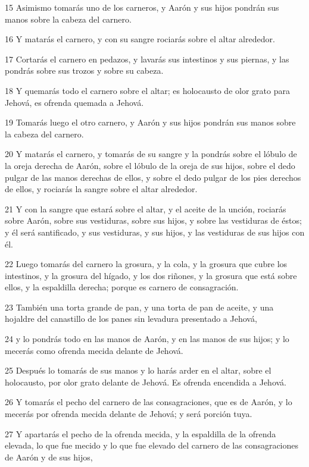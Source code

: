 \par 15 Asimismo tomarás uno de los carneros, y Aarón y sus hijos pondrán sus manos sobre la cabeza del carnero.
\par 16 Y matarás el carnero, y con su sangre rociarás sobre el altar alrededor.
\par 17 Cortarás el carnero en pedazos, y lavarás sus intestinos y sus piernas, y las pondrás sobre sus trozos y sobre su cabeza.
\par 18 Y quemarás todo el carnero sobre el altar; es holocausto de olor grato  para Jehová, es ofrenda quemada a Jehová.
\par 19 Tomarás luego el otro carnero, y Aarón y sus hijos pondrán sus manos sobre la cabeza del carnero.
\par 20 Y matarás el carnero, y tomarás de su sangre y la pondrás sobre el lóbulo de la oreja derecha de Aarón, sobre el lóbulo de la oreja de sus hijos, sobre el dedo pulgar de las manos derechas de ellos, y sobre el dedo pulgar de los pies derechos de ellos, y rociarás la sangre sobre el altar alrededor.
\par 21 Y con la sangre que estará sobre el altar, y el aceite de la unción, rociarás sobre Aarón, sobre sus vestiduras, sobre sus hijos, y sobre las vestiduras de éstos; y él será santificado, y sus vestiduras, y sus hijos, y las vestiduras de sus hijos con él.
\par 22 Luego tomarás del carnero la grosura, y la cola, y la grosura que cubre los intestinos, y la grosura del hígado, y los dos riñones, y la grosura que está sobre ellos, y la espaldilla derecha; porque es carnero de consagración.
\par 23 También una torta grande de pan, y una torta de pan de aceite, y una hojaldre del canastillo de los panes sin levadura presentado a Jehová,
\par 24 y lo pondrás todo en las manos de Aarón, y en las manos de sus hijos; y lo mecerás como ofrenda mecida delante de Jehová.
\par 25 Después lo tomarás de sus manos y lo harás arder en el altar, sobre el holocausto, por olor grato delante de Jehová. Es ofrenda encendida a Jehová.
\par 26 Y tomarás el pecho del carnero de las consagraciones, que es de Aarón, y lo mecerás por ofrenda mecida delante de Jehová; y será porción tuya.
\par 27 Y apartarás el pecho de la ofrenda mecida, y la espaldilla de la ofrenda elevada, lo que fue mecido y lo que fue elevado del carnero de las consagraciones de Aarón y de sus hijos,
